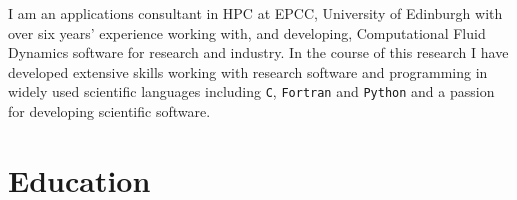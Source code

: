 \documentclass[10pt,a4paper]{moderncv} %
\begin{document}
\makecvtitle %
\vspace{-0.6cm}


I am an applications consultant in HPC at EPCC, University of Edinburgh with over six years' experience
working with, and developing, Computational Fluid Dynamics software for research and industry.
In the course of this research I have developed extensive skills working with research software and
programming in widely used scientific languages including \texttt{C}, \texttt{Fortran} and
\texttt{Python} and a passion for developing scientific software.


\section{Education}
\end{document}
